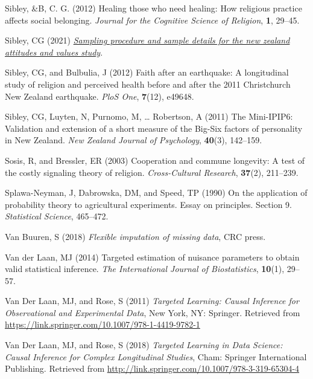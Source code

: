 \documentclass[
  single column]{article}
\newlength{\cslhangindent}
\newenvironment{CSLReferences}[2] %
 {\begin{list}{}{%
  \setlength{\itemindent}{0pt}
  \setlength{\leftmargin}{0pt}
  \setlength{\parsep}{0pt}
  \ifodd #1
   \setlength{\leftmargin}{\cslhangindent}
   \setlength{\itemindent}{-1\cslhangindent}
  \fi
  \setlength{\itemsep}{#2\baselineskip}}}
 {\end{list}}
\begin{document}
\begin{CSLReferences}{1}{0}
Sibley, \&B, C. G. (2012) Healing those who need healing: How religious
practice affects social belonging. \emph{Journal for the Cognitive
Science of Religion}, \textbf{1}, 29--45.

Sibley, CG (2021)
\emph{\href{https://doi.org/10.31234/osf.io/wgqvy}{Sampling procedure
and sample details for the new zealand attitudes and values study}}.

Sibley, CG, and Bulbulia, J (2012) Faith after an earthquake: A
longitudinal study of religion and perceived health before and after the
2011 {C}hristchurch {N}ew {Z}ealand earthquake. \emph{PloS One},
\textbf{7}(12), e49648.

Sibley, CG, Luyten, N, Purnomo, M, \ldots{} Robertson, A (2011) The
Mini-IPIP6: Validation and extension of a short measure of the Big-Six
factors of personality in New Zealand. \emph{New Zealand Journal of
Psychology}, \textbf{40}(3), 142--159.

Sosis, R, and Bressler, ER (2003) Cooperation and commune longevity: A
test of the costly signaling theory of religion. \emph{Cross-Cultural
Research}, \textbf{37}(2), 211--239.

Splawa-Neyman, J, Dabrowska, DM, and Speed, TP (1990) On the application
of probability theory to agricultural experiments. Essay on principles.
Section 9. \emph{Statistical Science}, 465--472.

Van Buuren, S (2018) \emph{Flexible imputation of missing data}, CRC
press.

Van der Laan, MJ (2014) Targeted estimation of nuisance parameters to
obtain valid statistical inference. \emph{The International Journal of
Biostatistics}, \textbf{10}(1), 29--57.

Van Der Laan, MJ, and Rose, S (2011) \emph{Targeted Learning: Causal
Inference for Observational and Experimental Data}, New York, NY:
Springer. Retrieved from
\url{https://link.springer.com/10.1007/978-1-4419-9782-1}

Van Der Laan, MJ, and Rose, S (2018) \emph{Targeted Learning in Data
Science: Causal Inference for Complex Longitudinal Studies}, Cham:
Springer International Publishing. Retrieved from
\url{http://link.springer.com/10.1007/978-3-319-65304-4}


\end{CSLReferences}
\end{document}
